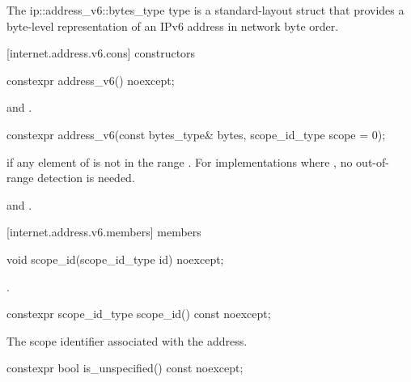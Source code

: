 \pnum
The ip::address_v6::bytes_type type is a standard-layout struct that provides a byte-level representation of an IPv6 address in network byte order.



[internet.address.v6.cons]{ constructors}

\begin{itemdecl}
constexpr address_v6() noexcept;
\end{itemdecl}

\begin{itemdescr}
\pnum
\postconditions {} and .
\end{itemdescr}

\begin{itemdecl}
constexpr address_v6(const bytes_type& bytes,
                     scope_id_type scope = 0);
\end{itemdecl}

\begin{itemdescr}
\pnum
\remarks {} if any element of  is not in the range \tcode{[0, 0xFF]}. \enternote For implementations where , no out-of-range detection is needed. \exitnote

\pnum
\postconditions {} and .
\end{itemdescr}



[internet.address.v6.members]{ members}

\begin{itemdecl}
void scope_id(scope_id_type id) noexcept;
\end{itemdecl}

\begin{itemdescr}
\pnum
\postconditions {}.
\end{itemdescr}

\begin{itemdecl}
constexpr scope_id_type scope_id() const noexcept;
\end{itemdecl}

\begin{itemdescr}
\pnum
\returns The scope identifier associated with the address.
\end{itemdescr}

\begin{itemdecl}
constexpr bool is_unspecified() const noexcept;
\end{itemdecl}


